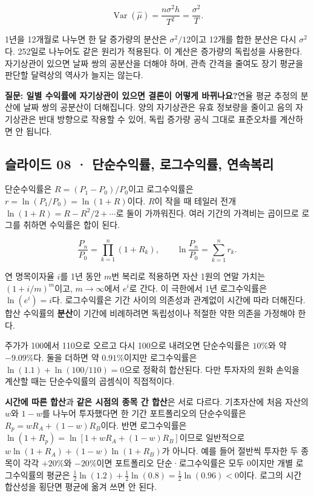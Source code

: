 \documentclass[11pt,a4paper]{article}
\begin{document}
\[
\operatorname{Var}(\hat\mu)=\frac{n\sigma^2h}{T^2}=\frac{\sigma^2}{T}.
\]

1년을 12개월로 나누면 한 달 증가량의 분산은 $\sigma^2/12$이고 12개를 합한 분산은 다시 $\sigma^2$다. 252일로 나누어도 같은 원리가 적용된다. 이 계산은 증가량의 독립성을 사용한다. 자기상관이 있으면 날짜 쌍의 공분산을 더해야 하며, 관측 간격을 줄여도 장기 평균을 판단할 달력상의 역사가 늘지는 않는다.\par

\begin{samepage}\par\medskip\noindent\textbf{질문: 일별 수익률에 자기상관이 있으면 결론이 어떻게 바뀌나요?}\quad 연율 평균 추정의 분산에 날짜 쌍의 공분산이 더해집니다. 양의 자기상관은 유효 정보량을 줄이고 음의 자기상관은 반대 방향으로 작용할 수 있어, 독립 증가량 공식 그대로 표준오차를 계산하면 안 됩니다.\par\end{samepage}

\subsection{슬라이드 08 · 단순수익률, 로그수익률, 연속복리}
단순수익률은 $R=(P_1-P_0)/P_0$이고 로그수익률은 $r=\ln(P_1/P_0)=\ln(1+R)$이다. $R$이 작을 때 테일러 전개 $\ln(1+R)=R-R^2/2+\cdots$로 둘이 가까워진다. 여러 기간의 가격비는 곱이므로 로그를 취하면 수익률은 합이 된다.\par

\[
\frac{P_n}{P_0}=\prod_{k=1}^n(1+R_k),\qquad
\ln\frac{P_n}{P_0}=\sum_{k=1}^n r_k.
\]

연 명목이자율 $i$를 1년 동안 $m$번 복리로 적용하면 자산 1원의 연말 가치는 $(1+i/m)^m$이고, $m\to\infty$에서 $e^i$로 간다. 이 극한에서 1년 로그수익률은 $\ln(e^i)=i$다. 로그수익률은 기간 사이의 의존성과 관계없이 시간에 따라 더해진다. 합산 수익률의 \textbf{분산}이 기간에 비례하려면 독립성이나 적절한 약한 의존을 가정해야 한다.\par

주가가 100에서 110으로 오르고 다시 100으로 내려오면 단순수익률은 $10\%$와 약 $-9.09\%$다. 둘을 더하면 약 $0.91\%$이지만 로그수익률은 $\ln(1.1)+\ln(100/110)=0$으로 정확히 합산된다. 다만 투자자의 원화 손익을 계산할 때는 단순수익률의 곱셈식이 직접적이다.\par

\textbf{시간에 따른 합산}과 \textbf{같은 시점의 종목 간 합산}은 서로 다르다. 기초자산에 처음 자산의 $w$와 $1-w$를 나누어 투자했다면 한 기간 포트폴리오의 단순수익률은 $R_p=wR_A+(1-w)R_B$이다. 반면 로그수익률은 $\ln(1+R_p)=\ln[1+wR_A+(1-w)R_B]$이므로 일반적으로 $w\ln(1+R_A)+(1-w)\ln(1+R_B)$가 아니다. 예를 들어 절반씩 투자한 두 종목이 각각 $+20\%$와 $-20\%$이면 포트폴리오 단순·로그수익률은 모두 0이지만 개별 로그수익률의 평균은 $\frac12\ln(1.2)+\frac12\ln(0.8)=\frac12\ln(0.96)<0$이다. 로그의 시간 합산성을 횡단면 평균에 옮겨 쓰면 안 된다.\par
\end{document}
